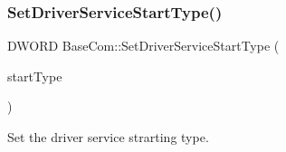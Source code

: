 \mbox{\label{class_base_com_a4c4f6cb8a6560a8a44fa7053d1747ea7}} 
\subsubsection{\texorpdfstring{Set\+Driver\+Service\+Start\+Type()}{SetDriverServiceStartType()}}
{\footnotesize\ttfamily D\+W\+O\+RD Base\+Com\+::\+Set\+Driver\+Service\+Start\+Type (\begin{DoxyParamCaption}\item[{D\+W\+O\+RD}]{start\+Type }\end{DoxyParamCaption})\hspace{0.3cm}{\ttfamily [static]}}



Set the driver service strarting type. 


